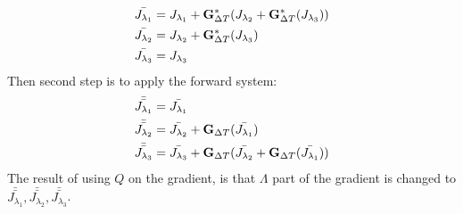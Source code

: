 \begin{align*}
\bar{J_{\lambda_1}} &=J_{\lambda_1} +\bold{G}_{\Delta T}^*(J_{\lambda_2} + \bold{G}_{\Delta T}^*(J_{\lambda_3}))\\
\bar{J_{\lambda_2}} &=J_{\lambda_2} + \bold{G}_{\Delta T}^*(J_{\lambda_3})\\
\bar{J_{\lambda_3}} &=J_{\lambda_3} 
\end{align*} 
Then second step is to apply the forward system:
\begin{align*}
\bar{\bar{J_{\lambda_1}}}&=\bar{J_{\lambda_1}} \\
\bar{\bar{J_{\lambda_2}}}&=\bar{J_{\lambda_2}}+ \bold{G}_{\Delta T}(\bar{J_{\lambda_1}}) \\
\bar{\bar{J_{\lambda_3}}}&=\bar{J_{\lambda_3}} + \bold{G}_{\Delta T}(\bar{J_{\lambda_2}}+ \bold{G}_{\Delta T}(\bar{J_{\lambda_1}}))
\end{align*} 
The result of using $Q$ on the gradient, is that $\Lambda$ part of the gradient is changed to $\bar{\bar{J_{\lambda_1}}}, \bar{\bar{J_{\lambda_2}}},\bar{\bar{J_{\lambda_3}}}$.  

